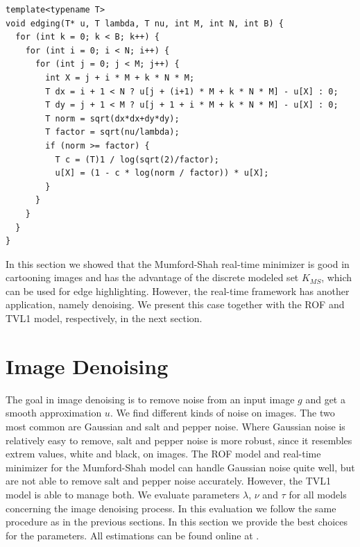 \documentclass[abstracton]{scrreprt}
\begin{document}
                \begin{lstlisting}
template<typename T>
void edging(T* u, T lambda, T nu, int M, int N, int B) {
  for (int k = 0; k < B; k++) {
    for (int i = 0; i < N; i++) {
      for (int j = 0; j < M; j++) {
        int X = j + i * M + k * N * M;
        T dx = i + 1 < N ? u[j + (i+1) * M + k * N * M] - u[X] : 0;
        T dy = j + 1 < M ? u[j + 1 + i * M + k * N * M] - u[X] : 0;
        T norm = sqrt(dx*dx+dy*dy);
        T factor = sqrt(nu/lambda);
        if (norm >= factor) {
          T c = (T)1 / log(sqrt(2)/factor);
          u[X] = (1 - c * log(norm / factor)) * u[X];
        }
      }
    }
  }
}
                \end{lstlisting}
        In this section we showed that the Mumford-Shah real-time minimizer is good in cartooning images and has the advantage of the discrete modeled set $K_{MS}$, which can be used for edge highlighting. However, the real-time framework has another application, namely denoising. We present this case together with the ROF and TVL1 model, respectively, in the next section.

    \section{Image Denoising} %
    \label{sec:image_denoising}
        
        The goal in image denoising is to remove noise from an input image $g$ and get a smooth approximation $u$. We find different kinds of noise on images. The two most common are Gaussian and salt and pepper noise. Where Gaussian noise is relatively easy to remove, salt and pepper noise is more robust, since it resembles extrem values, white and black, on images. The ROF model and real-time minimizer for the Mumford-Shah model can handle Gaussian noise quite well, but are not able to remove salt and pepper noise accurately. However, the TVL1 model is able to manage both. We evaluate parameters $\lambda$, $\nu$ and $\tau$ for all models concerning the image denoising process. In this evaluation we follow the same procedure as in the previous sections. In this section we provide the best choices for the parameters. All estimations can be found online at \cite{Bauer}.
\end{document}
